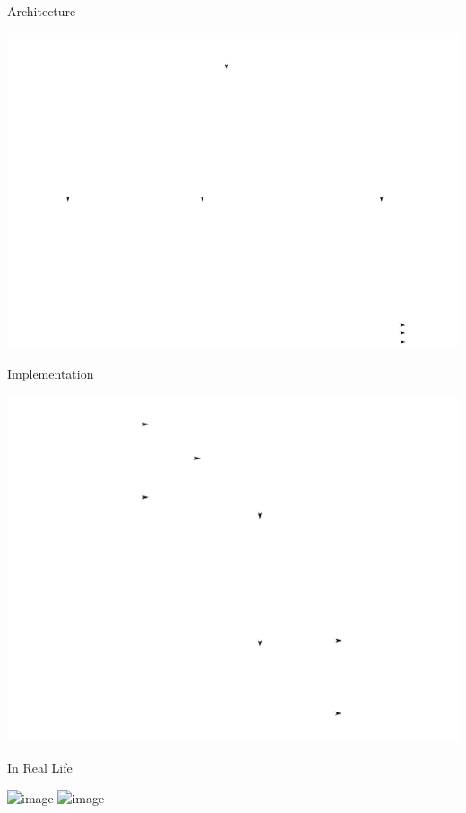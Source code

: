 \documentclass[10pt]{beamer}
\title{\projname}
\subtitle{A Hardware Beat Tracker}
\author{Joseph Colosimo}
\date{May 15, 2013}
\institute{Massachusetts Institute of Technology}
\begin{document}
\begin{frame}
    \titlepage
\end{frame}

\begin{frame}{Architecture}
    \begin{center}
        \includegraphics{fig/architecture.pdf}
    \end{center}
\end{frame}

\begin{frame}{Implementation}
    \begin{center}
        \includegraphics{fig/hwarch.pdf}
    \end{center}
\end{frame}

\begin{frame}{In Real Life}
    \begin{center}
        \includegraphics<1>[scale=0.45]{fig/dcbiasbrd.jpg}
        \includegraphics<2>[scale=0.5]{fig/setup.jpg}
    \end{center}
\end{frame}
\end{document}
